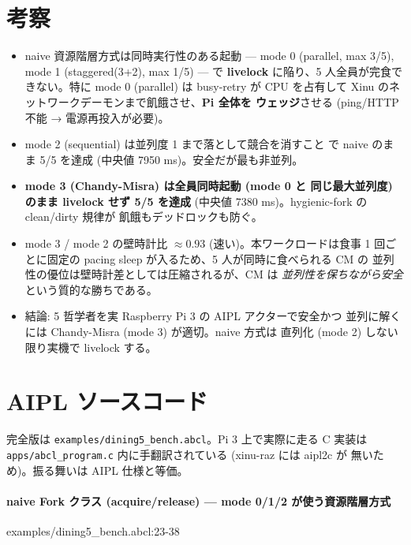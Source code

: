 \documentclass[a4paper,11pt]{ltjsarticle}
\begin{document}
\section{考察}

\begin{itemize}
  \item naive 資源階層方式は同時実行性のある起動 — mode 0 (parallel, max 3/5), mode 1 (staggered(3+2), max 1/5) — で \textbf{livelock} に陥り、5 人全員が完食できない。特に mode 0 (parallel) は busy-retry が CPU を占有して Xinu のネットワークデーモンまで飢餓させ、\textbf{Pi 全体を ウェッジ}させる (ping/HTTP 不能 → 電源再投入が必要)。
  \item mode 2 (sequential) は並列度 1 まで落として競合を消すこと で naive のまま 5/5 を達成 (中央値 7950 ms)。安全だが最も非並列。
  \item \textbf{mode 3 (Chandy-Misra) は全員同時起動 (mode 0 と 同じ最大並列度) のまま livelock せず 5/5 を達成} (中央値 7380 ms)。hygienic-fork の clean/dirty 規律が 飢餓もデッドロックも防ぐ。
  \item mode 3 / mode 2 の壁時計比 $\approx 0.93$ (速い)。本ワークロードは食事 1 回ごとに固定の pacing sleep が入るため、5 人が同時に食べられる CM の 並列性の優位は壁時計差としては圧縮されるが、CM は \emph{並列性を保ちながら安全}という質的な勝ちである。
  \item 結論: 5 哲学者を実 Raspberry Pi 3 の AIPL アクターで安全かつ 並列に解くには Chandy-Misra (mode 3) が適切。naive 方式は 直列化 (mode 2) しない限り実機で livelock する。
\end{itemize}

\section{AIPL ソースコード}

完全版は \texttt{examples/dining5\_bench.abcl}。Pi 3 上で実際に走る C 実装は
\texttt{apps/abcl\_program.c} 内に手翻訳されている (xinu-raz には aipl2c が
無いため)。振る舞いは AIPL 仕様と等価。

\paragraph{naive Fork クラス (acquire/release) — mode 0/1/2 が使う資源階層方式}\nopagebreak\par
{\footnotesize\ttfamily examples/dining5\_bench.abcl:23-38}\nopagebreak

\end{document}
